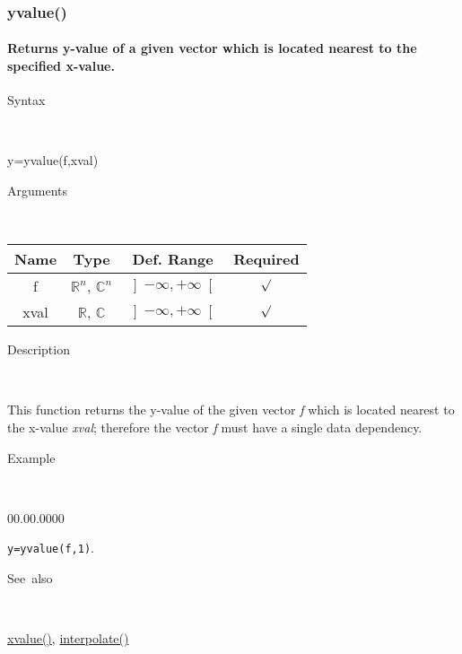 \newpage
\subsubsection*{\hypertarget{yvalue}{}{\Large yvalue()}}


\paragraph{\label{par:yvalue}Returns y-value of a given vector which is located
nearest to the specified x-value.}

\begin{description}
\item [Syntax]~
\end{description}
y=yvalue(f,xval)

\begin{description}
\item [Arguments]~
\end{description}
\begin{tabular}{|c|c|c|c|}
\hline 
Name&
Type&
Def. Range&
Required\tabularnewline
\hline
\hline 
f&
$\mathbb{R}^{n}$, $\mathbb{C}^{n}$&
$\left]-\infty,+\infty\right[$&
$\surd$\tabularnewline
\hline
xval&
$\mathbb{R}$, $\mathbb{C}$&
$\left]-\infty,+\infty\right[$&
$\surd$\tabularnewline
\hline
\end{tabular}

\begin{description}
\item [Description]~
\end{description}
This function returns the y-value of the given vector \textit{f} which
is located nearest to the x-value \textit{xval}; therefore the vector
\textit{f} must have a single data dependency.

\begin{description}
\item [Example]~
\end{description}
\begin{lyxlist}{00.00.0000}
\item [\texttt{y=yvalue(f,1)}.]~
\end{lyxlist}
\begin{description}
\item [See~also]~
\end{description}
\textcolor{blue}{\hyperlink{xvalue}{xvalue()}}\textcolor{black}{,}
\textcolor{blue}{\hyperlink{interpolate}{interpolate()}}


\newpage
{}

